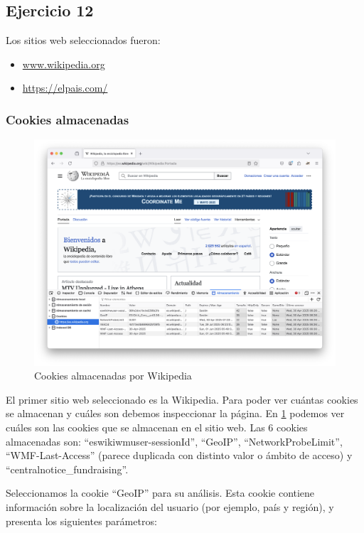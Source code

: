 \subsection{Ejercicio 12}
\graphicspath{ {img/12} }

Los sitios web seleccionados fueron:
\begin{itemize}
    \item \url{www.wikipedia.org}
    \item \url{https://elpais.com/}
\end{itemize}

\subsubsection{Cookies almacenadas}

\begin{figure}[H]
    \includegraphics[width=\textwidth]{cookies_wiki.png}
    \caption{Cookies almacenadas por Wikipedia}
    \label{fig:cookies_wiki}
\end{figure}

El primer sitio web seleccionado es la Wikipedia. Para poder ver cuántas cookies se almacenan y cuáles son debemos inspeccionar la página. En \ref{fig:cookies_wiki} podemos ver cuáles son las cookies que se almacenan en el sitio web. Las 6 cookies almacenadas son: ``eswikiwmuser-sessionId'', ``GeoIP'', ``NetworkProbeLimit'', ``WMF-Last-Access'' (parece duplicada con distinto valor o ámbito de acceso) y ``centralnotice\_fundraising''.

Seleccionamos la cookie ``GeoIP'' para su análisis. Esta cookie contiene información sobre la localización del usuario (por ejemplo, país y región), y presenta los siguientes parámetros: 

